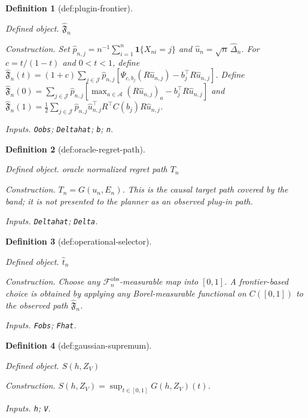 \documentclass{article}
\newtheorem{definition}{Definition}
\begin{document}
\begin{definition}[def:plugin-frontier]\label{def:plugin-frontier}
\par\smallskip\noindent\emph{Defined object.} \(\widehat{\mathfrak F}_n\)
\par\smallskip\noindent\emph{Construction.} Set \(\widehat p_{n,j}=n^{-1}\sum_{i=1}^n\mathbf 1\{X_{ni}=j\}\) and \(\widehat u_n=\sqrt n\,\widehat\Delta_n\). For \(c=t/(1-t)\) and \(0<t<1\), define \(\widehat{\mathfrak F}_n(t)=(1+c)\sum_{j\in\mathcal J}\widehat p_{n,j}[\Psi_{c,b_j}(R\widehat u_{n,j})-b_j^{\top}R\widehat u_{n,j}]\). Define \(\widehat{\mathfrak F}_n(0)=\sum_{j\in\mathcal J}\widehat p_{n,j}[\max_{a\in\mathcal A}(R\widehat u_{n,j})_a-b_j^{\top}R\widehat u_{n,j}]\) and \(\widehat{\mathfrak F}_n(1)=\frac12\sum_{j\in\mathcal J}\widehat p_{n,j}\widehat u_{n,j}^{\top}R^{\top}C(b_j)R\widehat u_{n,j}\).
\par\smallskip\noindent\emph{Inputs.} \texttt{Oobs}; \texttt{Deltahat}; \texttt{b}; \texttt{n}.
\end{definition}

\begin{definition}[def:oracle-regret-path]\label{def:oracle-regret-path}
\par\smallskip\noindent\emph{Defined object.} oracle normalized regret path \(T_n\)
\par\smallskip\noindent\emph{Construction.} \(T_n=G(u_n,E_n)\). This is the causal target path covered by the band; it is not presented to the planner as an observed plug-in path.
\par\smallskip\noindent\emph{Inputs.} \texttt{Deltahat}; \texttt{Delta}.
\end{definition}

\begin{definition}[def:operational-selector]\label{def:operational-selector}
\par\smallskip\noindent\emph{Defined object.} \(\widehat t_n\)
\par\smallskip\noindent\emph{Construction.} Choose any \(\mathcal F_n^{\mathrm{obs}}\)-measurable map into \([0,1]\). A frontier-based choice is obtained by applying any Borel-measurable functional on \(C([0,1])\) to the observed path \(\widehat{\mathfrak F}_n\).
\par\smallskip\noindent\emph{Inputs.} \texttt{Fobs}; \texttt{Fhat}.
\end{definition}

\begin{definition}[def:gaussian-supremum]\label{def:gaussian-supremum}
\par\smallskip\noindent\emph{Defined object.} \(S(h,Z_V)\)
\par\smallskip\noindent\emph{Construction.} \(S(h,Z_V)=\sup_{t\in[0,1]}G(h,Z_V)(t)\).
\par\smallskip\noindent\emph{Inputs.} \texttt{h}; \texttt{V}.
\end{definition}
\end{document}
